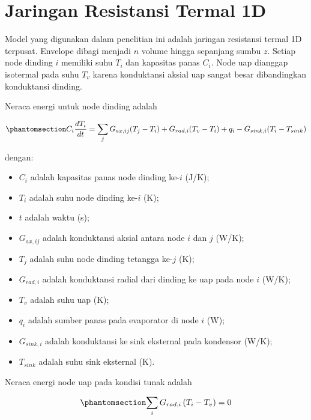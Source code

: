 \documentclass[
  indonesian,
  12pt,
  a4paper,
]{report}
\providecommand{\tightlist}{%
  \setlength{\itemsep}{0pt}\setlength{\parskip}{0pt}}
\begin{document}
\section{Jaringan Resistansi Termal
1D}\label{jaringan-resistansi-termal-1d}

Model yang digunakan dalam penelitian ini adalah jaringan resistansi
termal 1D terpusat. Envelope dibagi menjadi \(n\) volume hingga
sepanjang sumbu \(z\). Setiap node dinding \(i\) memiliki suhu \(T_i\)
dan kapasitas panas \(C_i\). Node uap dianggap isotermal pada suhu
\(T_v\) karena konduktansi aksial uap sangat besar dibandingkan
konduktansi dinding.

Neraca energi untuk node dinding adalah

\begin{equation}\protect\phantomsection\label{eq-network}{ C_i \frac{dT_i}{dt} = \sum_j G_{ax,ij}(T_j-T_i)
   + G_{rad,i}(T_v-T_i) + q_i - G_{sink,i}(T_i-T_{sink})
   }\end{equation}

dengan:

\begin{itemize}
\tightlist
\item
  \(C_i\) adalah kapasitas panas node dinding ke-\(i\) (J/K);
\item
  \(T_i\) adalah suhu node dinding ke-\(i\) (K);
\item
  \(t\) adalah waktu (s);
\item
  \(G_{ax,ij}\) adalah konduktansi aksial antara node \(i\) dan \(j\)
  (W/K);
\item
  \(T_j\) adalah suhu node dinding tetangga ke-\(j\) (K);
\item
  \(G_{rad,i}\) adalah konduktansi radial dari dinding ke uap pada node
  \(i\) (W/K);
\item
  \(T_v\) adalah suhu uap (K);
\item
  \(q_i\) adalah sumber panas pada evaporator di node \(i\) (W);
\item
  \(G_{sink,i}\) adalah konduktansi ke sink eksternal pada kondensor
  (W/K);
\item
  \(T_{sink}\) adalah suhu sink eksternal (K).
\end{itemize}

Neraca energi node uap pada kondisi tunak adalah

\begin{equation}\protect\phantomsection\label{eq-vapor}{ \sum_i G_{rad,i}\,(T_i-T_v) = 0 }\end{equation}
\end{document}
